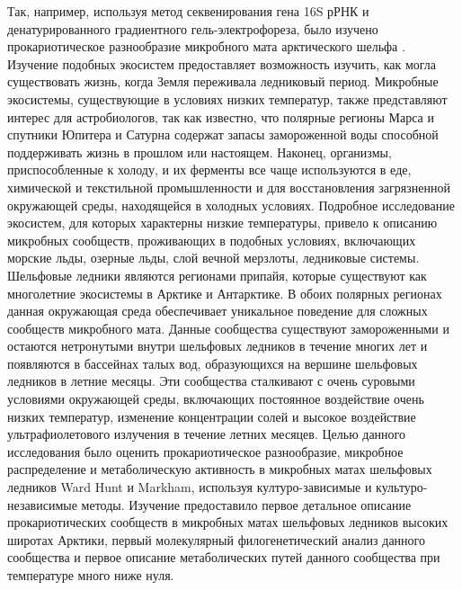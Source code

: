 Так, например, используя метод секвенирования гена 16S рРНК и денатурированного градиентного гель-электрофореза, было изучено прокариотическое разнообразие микробного мата арктического шельфа \cite{Bottos2008}. Изучение подобных экосистем предоставляет возможность изучить, как могла существовать жизнь, когда Земля переживала ледниковый период. Микробные экосистемы, существующие в условиях низких температур, также представляют интерес для астробиологов, так как известно, что полярные регионы Марса и спутники Юпитера и Сатурна содержат запасы замороженной воды способной поддерживать жизнь в прошлом или настоящем. Наконец, организмы, приспособленные к холоду,  и их ферменты все чаще используются в еде, химической и текстильной промышленности и для восстановления загрязненной окружающей среды, находящейся в холодных условиях. Подробное исследование экосистем, для которых характерны низкие температуры, привело к описанию микробных сообществ, проживающих в подобных условиях, включающих морские льды, озерные льды, слой вечной мерзлоты, ледниковые системы. Шельфовые ледники являются регионами припайя, которые существуют как многолетние экосистемы в Арктике и Антарктике. В обоих полярных регионах данная окружающая среда обеспечивает уникальное поведение для сложных сообществ микробного мата. Данные сообщества существуют замороженными и остаются нетронутыми внутри шельфовых ледников в течение многих лет и появляются в бассейнах талых вод, образующихся на вершине  шельфовых ледников в летние месяцы. Эти сообщества сталкивают с очень суровыми условиями окружающей среды, включающих постоянное воздействие очень низких температур, изменение концентрации солей и высокое воздействие ультрафиолетового излучения в течение летних месяцев. Целью данного исследования было оценить прокариотическое разнообразие, микробное распределение и метаболическую активность в микробных матах шельфовых ледников Ward Hunt и Markham, используя културо-зависимые и культуро-независимые методы. Изучение предоставило первое детальное описание прокариотических сообществ в микробных матах шельфовых ледников высоких широтах Арктики, первый молекулярный филогенетический анализ данного сообщества и первое описание метаболических путей данного сообщества при температуре много ниже нуля. 

